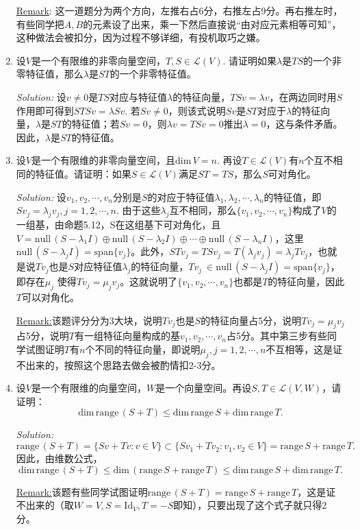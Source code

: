 \documentclass[a4[paper]{article}
\newcommand\spa{\mathrm{span}}  %
\def\dim{\mathrm{dim}\,}
\def\range{\mathrm{range}\,}
\def\Null{\mathrm{null}\,}
\begin{document}
\begin{enumerate}[1.]
\noindent{}\underline{Remark}: 这一道题分为两个方向，左推右占6分，右推左占9分。再右推左时，有些同学把$A,B$的元素设了出来，乘一下然后直接说“由对应元素相等可知”，这种做法会被扣分，因为过程不够详细，有投机取巧之嫌。

\item 设$V$是一个有限维的非零向量空间，$T,S\in \mathcal{L}(V)$. 请证明如果$\lambda$是$TS$的一个非零特征值，那么$\lambda$是$ST$的一个非零特征值。

\smallskip

\noindent{}\emph{Solution:} 设$v\ne 0$是$TS$对应与特征值$\lambda$的特征向量，$TS v =\lambda v$，在两边同时用$S$作用即可得到$STSv = \lambda Sv$. 若$Sv\ne0$，则该式说明$Sv$是$ST$对应于$\lambda$的特征向量，$\lambda$是$ST$的特征值；若$Sv=0$，则$\lambda v = TSv =0$推出$\lambda=0$，这与条件矛盾。因此，$\lambda$是$ST$的特征值。

\bigskip

\item 设$V$是一个有限维的非零向量空间，且$\dim V=n$. 再设$T\in\mathcal{L}(V)$有$n$个互不相同的特征值。请证明：如果$S\in\mathcal{L}(V)$满足$ST=TS$，那么$S$可对角化。

\smallskip

\noindent{}\emph{Solution:} 设$v_1,v_2,\cdots,v_n$分别是$S$的对应于特征值$\lambda_1,\lambda_2,\cdots,\lambda_n$的特征值，即$Sv_j=\lambda_j v_j,j=1,2,\cdots,n$. 由于这些$\lambda_j$互不相同，那么$\{v_1,v_2,\cdots,v_n\}$构成了$V$的一组基，由命题5.12，S在这组基下可对角化，且$V=\Null(S-\lambda_1 I)\oplus \Null(S-\lambda_2 I)\oplus\cdots\oplus \Null(S-\lambda_n I)$，这里$\Null(S-\lambda_j I) = \spa\{v_j\}$。此外，$STv_j = TSv_j = T(\lambda_j v_j) = \lambda_j Tv_j$，也就是说$Tv_j$也是$S$对应特征值$\lambda_j$的特征向量，$Tv_j\ \in \Null(S-\lambda_j I)=\spa\{v_j\}$，即存在$\mu_j$ 使得$ Tv_j = \mu_j v_j$。这就说明了$\{v_1,v_2,\cdots,v_n\}$也都是$T$的特征向量，因此$T$可以对角化。

\noindent{}\underline{Remark:}该题评分分为3大块，说明$Tv_j$也是$S$的特征向量占5分，说明$Tv_j=\mu_j v_j$占5分，说明$T$有一组特征向量构成的基$v_1,v_2,\cdots,v_n$占5分。其中第三步有些同学试图证明$T$有$n$个不同的特征向量，即说明$\mu_j,j=1,2,\cdots,n$不互相等，这是证不出来的，按照这个思路去做会被酌情扣2-3分。

\bigskip

\item 设$V$是一个有限维的向量空间，$W$是一个向量空间。再设$S,T\in\mathcal{L}(V,W)$，请证明：
\[\dim \range(S+T)\le \dim \range S +\dim \range T.\]

\smallskip

\noindent{}\emph{Solution:} 
$$\range (S+T)=\{Sv+Tv:v\in V\}\subset\{Sv_1+Tv_2:v_1,v_2\in V\}=\range S+\range T.$$
因此，由维数公式，
\[\dim \range(S+T) \le \dim(\range S+\range T)\le \dim \range S+\dim \range T.\]

\noindent{}\underline{Remark:}该题有些同学试图证明$\range (S+T) = \range S+\range T$，这是证不出来的（取$W=V,S=\mathrm{Id}_V, T= -S$即知），只要出现了这个式子就只得2分。
\end{enumerate}
\end{document}
